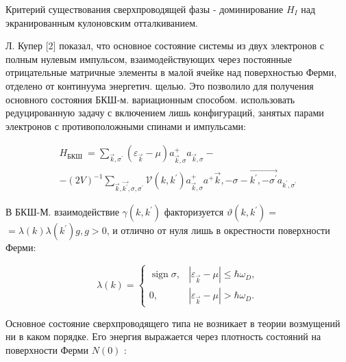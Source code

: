 \documentclass[10pt]{article}
\begin{document}
Критерий существования сверхпроводящей фазы - доминирование $H_{I}$ над экранированным кулоновским отталкиванием.



Л. Купер [2] показал, что основное состояние системы из двух электронов с полным нулевым импульсом, взаимодействующих через постоянные отрицательные матричные элементы в малой ячейке над поверхностью Ферми, отделено от континуума энергетич. щелью. Это позволило для получения основного состояния БКШ-м. вариационным способом. использовать редуцированную задачу с включением лишь конфигураций, занятых парами электронов с противоположными спинами и импульсами:



\[

\begin{gathered}

H_{\text {БКШ }}=\sum_{\vec{k}, \sigma^{\prime}}\left(\varepsilon_{\vec{k}}-\mu\right) a_{\vec{k}, \sigma}^{+} a_{\vec{k}, \sigma}- \\

-(2 V)^{-1} \sum_{\vec{k}, \overrightarrow{k^{\prime}}, \sigma, \sigma^{\prime}} \mathscr{V}\left(k, k^{\prime}\right) a_{\vec{k}, \sigma}^{+} a^{+} \vec{k},-\sigma-\overrightarrow{k^{\prime},-\sigma^{\prime}} a_{k^{\prime}, \sigma^{\prime}}

\end{gathered}

\]



В БКШ-М. взаимодействие $\gamma\left(k, k^{\prime}\right)$ факторизуется $\vartheta\left(k, k^{\prime}\right)=$ $=\lambda(k) \lambda\left(k^{\prime}\right) g, g>0$, и отлично от нуля лишь в окрестности поверхности Ферми:



\[

\lambda(k)= \begin{cases}\operatorname{sign} \sigma, & \left|\varepsilon_{\vec{k}}-\mu\right| \leqslant \hbar \omega_{D}, \\ 0, & \left|\varepsilon_{\vec{k}}-\mu\right|>\hbar \omega_{D} .\end{cases}

\]



Основное состояние сверхпроводящего типа не возникает в теории возмущений ни в каком порядке. Его энергия выражается через плотность состояний на поверхности Ферми $N(0)$ :
\end{document}
